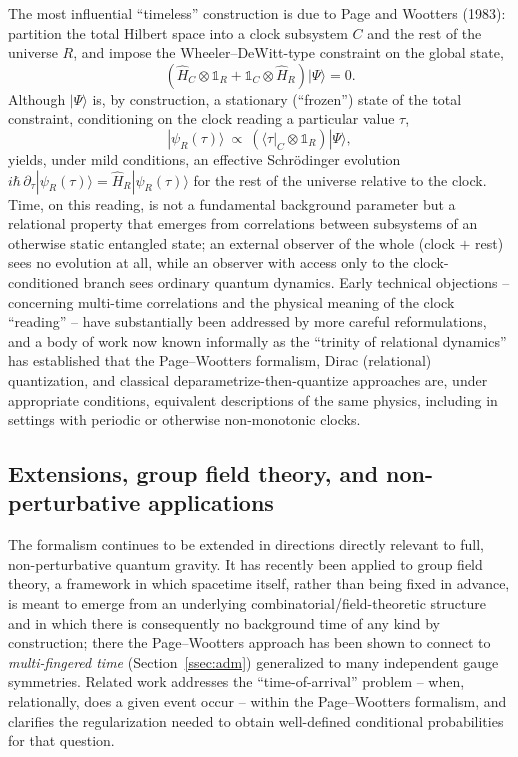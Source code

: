 \documentclass[11pt]{article}
\newcommand{\pd}{\partial}
\newcommand{\ket}[1]{|#1\rangle}
\newcommand{\bra}[1]{\langle #1|}
\newcommand{\Op}[1]{\hat{#1}}
\begin{document}
The most influential ``timeless'' construction is due to Page and Wootters (1983): partition the total Hilbert space into a clock subsystem $C$ and the rest of the universe $R$, and impose the Wheeler--DeWitt-type constraint on the global state,
\begin{equation}
\left(\Op{H}_C\otimes \mathbb{1}_R + \mathbb{1}_C\otimes \Op{H}_R\right)\ket{\Psi} = 0.
\end{equation}
Although $\ket{\Psi}$ is, by construction, a stationary (``frozen'') state of the total constraint, conditioning on the clock reading a particular value $\tau$,
\begin{equation}
\ket{\psi_R(\tau)} \ \propto\ \left(\bra{\tau}_C\otimes\mathbb{1}_R\right)\ket{\Psi},
\end{equation}
yields, under mild conditions, an effective Schr\"odinger evolution $i\hbar\,\pd_\tau\ket{\psi_R(\tau)} = \Op{H}_R\ket{\psi_R(\tau)}$ for the rest of the universe relative to the clock. Time, on this reading, is not a fundamental background parameter but a relational property that emerges from correlations between subsystems of an otherwise static entangled state; an external observer of the whole (clock $+$ rest) sees no evolution at all, while an observer with access only to the clock-conditioned branch sees ordinary quantum dynamics. Early technical objections -- concerning multi-time correlations and the physical meaning of the clock ``reading'' -- have substantially been addressed by more careful reformulations, and a body of work now known informally as the ``trinity of relational dynamics'' has established that the Page--Wootters formalism, Dirac (relational) quantization, and classical deparametrize-then-quantize approaches are, under appropriate conditions, equivalent descriptions of the same physics, including in settings with periodic or otherwise non-monotonic clocks.

\subsection{Extensions, group field theory, and non-perturbative applications}

The formalism continues to be extended in directions directly relevant to full, non-perturbative quantum gravity. It has recently been applied to group field theory, a framework in which spacetime itself, rather than being fixed in advance, is meant to emerge from an underlying combinatorial/field-theoretic structure and in which there is consequently no background time of any kind by construction; there the Page--Wootters approach has been shown to connect to \emph{multi-fingered time} (Section~\ref{ssec:adm}) generalized to many independent gauge symmetries. Related work addresses the ``time-of-arrival'' problem -- when, relationally, does a given event occur -- within the Page--Wootters formalism, and clarifies the regularization needed to obtain well-defined conditional probabilities for that question.
\end{document}

